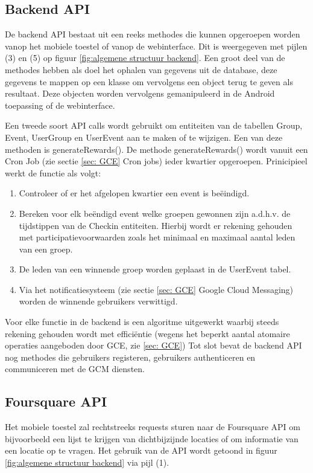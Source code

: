 \subsection{Backend API}
\label{backend API}
De backend API bestaat uit een reeks methodes die kunnen opgeroepen worden vanop het mobiele toestel of vanop de webinterface. Dit is weergegeven met pijlen (3) en (5) op figuur \ref{fig:algemene structuur backend}. Een groot deel van de methodes hebben als doel het ophalen van gegevens uit de database, deze gegevens te mappen op een klasse om vervolgens een object terug te geven als resultaat. Deze objecten worden vervolgens gemanipuleerd in de Android toepassing of de webinterface.

Een tweede soort API calls wordt gebruikt om entiteiten van de tabellen Group, Event, UserGroup en UserEvent aan te maken of te wijzigen. Een van deze methoden is generateRewards(). De methode generateRewards() wordt vanuit een Cron Job (zie sectie \ref{sec: GCE} Cron jobs) ieder kwartier opgeroepen. Prinicipieel werkt de functie als volgt:
\begin{enumerate}
	\item Controleer of er het afgelopen kwartier een event is beëindigd.
	\item Bereken voor elk beëndigd event welke groepen gewonnen zijn a.d.h.v. de tijdstippen van de Checkin entiteiten. Hierbij wordt er rekening gehouden met participatievoorwaarden zoals het minimaal en maximaal aantal leden van een groep.
	\item De leden van een winnende groep worden geplaast in de UserEvent tabel.
	\item Via het notificatiesysteem (zie sectie \ref{sec: GCE} Google Cloud Messaging) worden de winnende gebruikers verwittigd.
\end{enumerate}
Voor elke functie in de backend is een algoritme uitgewerkt waarbij steeds rekening gehouden wordt met efficiëntie (wegens het beperkt aantal atomaire operaties aangeboden door GCE, zie \ref{sec: GCE})
Tot slot bevat de backend API nog methodes die gebruikers registeren, gebruikers authenticeren en communiceren met de GCM diensten. 

\subsection{Foursquare API}
Het mobiele toestel zal rechtstreeks requests sturen naar de Foursquare API om bijvoorbeeld een lijst te krijgen van dichtbijzijnde locaties of om informatie van een locatie op te vragen. Het gebruik van de API wordt getoond in figuur \ref{fig:algemene structuur backend} via pijl (1).


